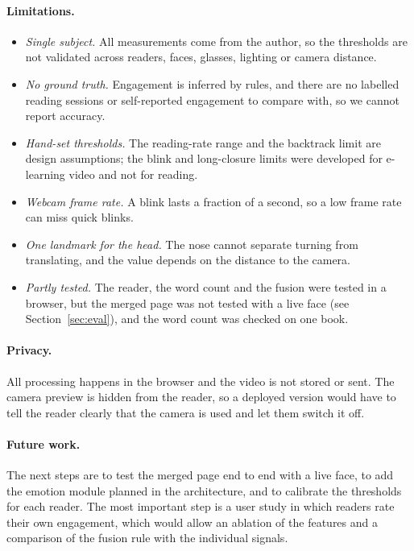 \documentclass[sigconf,nonacm]{acmart}
\begin{document}
\paragraph{Limitations.}
\begin{itemize}
  \item \emph{Single subject.} All measurements come from the author, so the thresholds are not validated across readers,
        faces, glasses, lighting or camera distance.
  \item \emph{No ground truth.} Engagement is inferred by rules, and there are no labelled reading sessions or
        self-reported engagement to compare with, so we cannot report accuracy.
  \item \emph{Hand-set thresholds.} The reading-rate range and the backtrack limit are design assumptions; the blink and
        long-closure limits were developed for e-learning video and not for reading.
  \item \emph{Webcam frame rate.} A blink lasts a fraction of a second, so a low frame rate can miss quick blinks.
  \item \emph{One landmark for the head.} The nose cannot separate turning from translating, and the value depends on the
        distance to the camera.
  \item \emph{Partly tested.} The reader, the word count and the fusion were tested in a browser, but the merged page was not
        tested with a live face (see Section~\ref{sec:eval}), and the word count was checked on one book.
\end{itemize}

\paragraph{Privacy.}
All processing happens in the browser and the video is not stored or sent. The camera preview is hidden from the
reader, so a deployed version would have to tell the reader clearly that the camera is used and let them switch it off.

\paragraph{Future work.}
The next steps are to test the merged page end to end with a live face, to add the emotion module
planned in the architecture, and to calibrate the thresholds for each reader. The most important step is a user study in
which readers rate their own engagement, which would allow an ablation of the features and a comparison of the fusion rule
with the individual signals.
\end{document}
